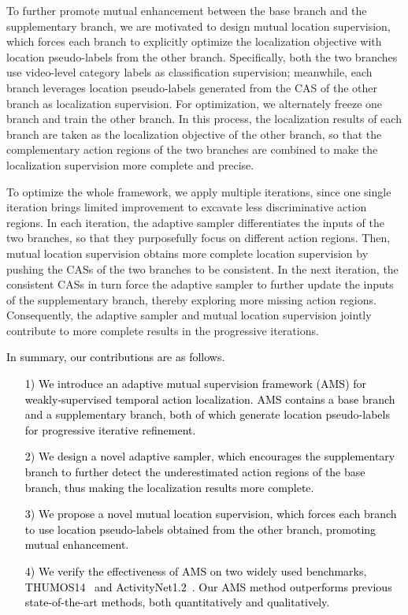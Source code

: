 \documentclass[journal]{IEEEtran}
\begin{document}
To further promote mutual enhancement between the base branch and the supplementary branch, we are motivated to design mutual location supervision, which forces each branch to explicitly optimize the localization objective with location pseudo-labels from the other branch. Specifically, both the two branches use video-level category labels as classification supervision; meanwhile, each branch leverages location pseudo-labels generated from the CAS of the other branch as localization supervision. For optimization, we alternately freeze one branch and train the other branch. In this process, the localization results of each branch are taken as the localization objective of the other branch, so that the complementary action regions of the two branches are combined to make the localization supervision more complete and precise.



To optimize the whole framework, we apply multiple iterations, since one single iteration brings limited improvement to excavate less discriminative action regions. In each iteration, the adaptive sampler differentiates the inputs of the two branches, so that they purposefully focus on different action regions. Then, mutual location supervision obtains more complete location supervision by pushing the CASs of the two branches to be consistent. In the next iteration, the consistent CASs in turn force the adaptive sampler to further update the inputs of the supplementary branch, thereby exploring more missing action regions. Consequently, the adaptive sampler and mutual location supervision jointly contribute to more complete results in the progressive iterations.



\textcolor{black}{In summary, our contributions are as follows. 
\begin{itemize}
  \item [1)] 
   We introduce an adaptive mutual supervision framework (AMS) for weakly-supervised temporal action localization. AMS contains a base branch and a supplementary branch, both of which generate location pseudo-labels for progressive iterative refinement.
  \item [2)]
   We design a novel adaptive sampler, which encourages the supplementary branch to further detect the underestimated action regions of the base branch, thus making the localization results more complete.
  \item [3)]
   We propose a novel mutual location supervision, which forces each branch to use location pseudo-labels obtained from the other branch, promoting mutual enhancement.
  \item [4)]
   We verify the effectiveness of AMS on two widely used benchmarks, THUMOS14~\cite{jiang2014thumos} and ActivityNet1.2~\cite{caba2015activitynet}. Our AMS method outperforms previous state-of-the-art methods, both quantitatively and qualitatively.
\end{itemize}}
\end{document}
